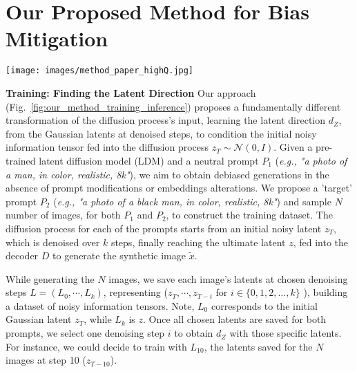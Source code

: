 \section{Our Proposed Method for Bias Mitigation}
\label{mitigation_section}
\begin{figure*}[htb!]
  \centering
   \texttt{[image: images/method\_paper\_highQ.jpg]}
  \caption{\textbf{Summary of our training (left) and inference (right) approach.} We use $P_{1}$ and $P_{2}$ to generate $N$ images $\Tilde{x}$. With their latents, chosen at step $i$, we train a $SVM$ to learn $d_{Z}$. We debias the neutral prompt $P_{1}$, applying $d_{Z}$ to the random initial latent $z_{T} \sim N(\mu, \sigma^2)$ at a specific $\omega$ weight, shifting the generations towards debiased samples with the attributes learned through the latent direction.}
  \label{fig:our_method_training_inference}
\end{figure*}
\noindent\textbf{Training: Finding the Latent Direction}
Our approach (Fig.~\ref{fig:our_method_training_inference}) proposes a fundamentally different transformation of the diffusion process's input, learning the latent direction $d_{Z}$, from the Gaussian latents at denoised steps, to condition the initial noisy information tensor fed into the diffusion process $z_{T} \sim \mathcal{N}(0, I)$. Given a pre-trained latent diffusion model (LDM) and a neutral prompt $P_{1}$ (\textit{e.g., "a photo of a man, in color, realistic, 8k"}), we aim to obtain debiased generations in the absence of prompt modifications or embeddings alterations. We propose a 'target' prompt $P_{2}$ (\textit{e.g., "a photo of a black man, in color, realistic, 8k"}) and sample $N$ number of images, for both $P_{1}$ and $P_{2}$, to construct the training dataset. The diffusion process for each of the prompts starts from an initial noisy latent  $z_{T}$, which is denoised over $k$ steps, finally reaching the ultimate latent $z$, fed into the decoder $D$ to generate the synthetic image $\tilde{x}$. 

While generating the $N$ images, we save each image's latents at chosen denoising steps $L = (L_{0}, \cdots, L_{k})$, representing ($z_{T},\cdots,z_{T-i}$ for $i \in \{0, 1, 2, \ldots, k\}$ ), building a dataset of noisy information tensors. Note, $L_{0}$ corresponds to the initial Gaussian latent $z_{T}$, while $L_{k}$ is $z$. Once all chosen latents are saved for both prompts, we select one denoising step $i$ to obtain $d_{Z}$ with those specific latents. For instance, we could decide to train with $L_{10}$, the latents saved for the $N$ images at step 10 ($z_{T-10}$). 

